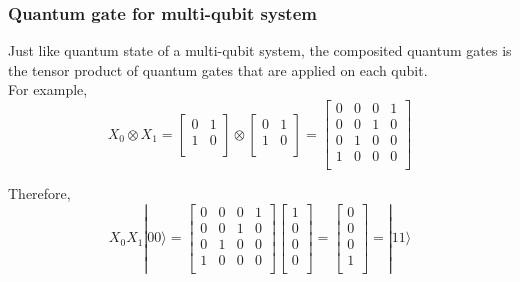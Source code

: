 \subsubsection{Quantum gate for multi-qubit system}

Just like quantum state of a multi-qubit system, the composited quantum gates is the tensor product of quantum gates that are applied on each qubit.  \\For example, 
$$ X_0 \otimes X_1 = 
\begin{bmatrix}
0 & 1 \\
1 & 0 \\
\end{bmatrix}
\otimes
 \begin{bmatrix}
0 & 1 \\
1 & 0 \\
\end{bmatrix}
=  \begin{bmatrix}
0 & 0 & 0 & 1 \\
0 & 0 & 1 & 0 \\
0 & 1 & 0 & 0 \\
1 & 0 & 0 & 0 \\
\end{bmatrix}
$$

Therefore, 
$$ X_0X_1 |00\rangle = 
\begin{bmatrix}
0 & 0 & 0 & 1 \\
0 & 0 & 1 & 0 \\
0 & 1 & 0 & 0 \\
1 & 0 & 0 & 0 \\
\end{bmatrix}
\left[
\begin{array}{c}
1 \\
0 \\
0 \\
0 \\
\end{array}
\right] 
= \left[
\begin{array}{c}
0 \\
0 \\
0 \\
1 \\
\end{array}
\right] 
= |11\rangle
$$

